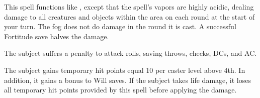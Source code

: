 \spellrng{\rngmed}
\spelldur{\durshort}
\begin{spelleffect}
  This spell functions like , except that the spell's vapors are highly acidic, dealing damage to all creatures and objects within the area on each round at the start of your turn. The fog does not do damage in the round it is cast. A successful Fortitude save halves the damage.
\end{spelleffect}

\spellrng{\rngclose}
\begin{spelleffect}
  The subject suffers a  penalty to attack rolls, saving throws, checks, DCs, and AC.
\end{spelleffect}

\spellrng{\rngclose}
\spelldur{\durshort}
\begin{spelleffect}
  The subject gains temporary hit points equal 10  per caster level above 4th. In addition, it gains a  bonus to Will saves. \bonusscalingdescription  If the subject takes life damage, it loses all temporary hit points provided by this spell before applying the damage.
\end{spelleffect}

